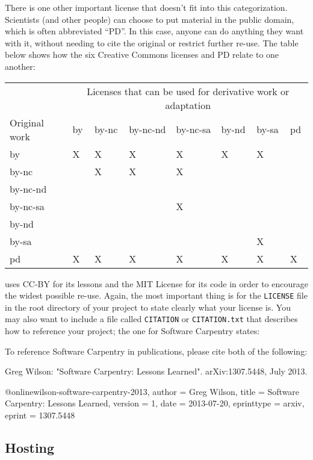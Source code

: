 There is one other important license that doesn't fit into this
categorization. Scientists (and other people) can choose to put material
in the public domain, which is often abbreviated ``PD''. In this case,
anyone can do anything they want with it, without needing to cite the
original or restrict further re-use. The table below shows how the six
Creative Commons licenses and PD relate to one another:

\begin{tabular}{llllllll}
& \multicolumn{7}{c}{Licenses that can be used for derivative work or adaptation} \\
Original work & by & by-nc & by-nc-nd & by-nc-sa & by-nd & by-sa & pd \\
by & X & X & X & X & X & X & \\
by-nc & & X & X & X & & & \\
by-nc-nd & & & & & & & \\
by-nc-sa & & & & X & & & \\
by-nd & & & & & & & \\
by-sa & & & & & & X & \\
pd & X & X & X & X & X & X & X \\
\end{tabular}

uses CC-BY for its lessons and the MIT License for its code in order to
encourage the widest possible re-use. Again, the most important thing is
for the \texttt{LICENSE} file in the root directory of your project to
state clearly what your license is. You may also want to include a file
called \texttt{CITATION} or \texttt{CITATION.txt} that describes how to
reference your project; the one for Software Carpentry states:

\begin{VerbFile}
To reference Software Carpentry in publications, please cite both of the following:

Greg Wilson: "Software Carpentry: Lessons Learned". arXiv:1307.5448, July 2013.

@online{wilson-software-carpentry-2013,
  author      = {Greg Wilson},
  title       = {Software Carpentry: Lessons Learned},
  version     = {1},
  date        = {2013-07-20},
  eprinttype  = {arxiv},
  eprint      = {1307.5448}
}
\end{VerbFile}

\subsection*{Hosting}

